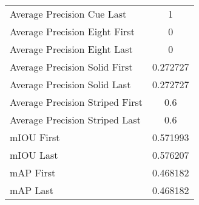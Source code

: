 \begin{figure}
\begin{subfigure}[b]{0.49\textwidth}
\begin{tabular}{|l|c|}
        Average Precision Cue Last & 1 \\
        Average Precision Eight First & 0 \\
        Average Precision Eight Last & 0 \\
        Average Precision Solid First & 0.272727 \\
        Average Precision Solid Last & 0.272727 \\
        Average Precision Striped First & 0.6 \\
        Average Precision Striped Last & 0.6 \\
        \hline
        mIOU First & 0.571993 \\
        mIOU Last & 0.576207 \\
        mAP First & 0.468182 \\
        mAP Last & 0.468182 \\
        \hline
    \end{tabular}
    
\end{subfigure}
\end{figure}

